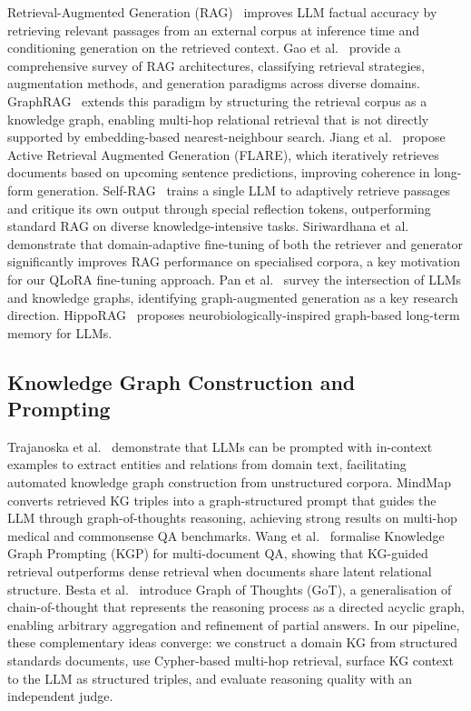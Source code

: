\documentclass[twocolumn]{article}
\begin{document}
Retrieval-Augmented Generation (RAG)~\cite{lewis2020rag} improves LLM factual accuracy by
retrieving relevant passages from an external corpus at inference time and conditioning
generation on the retrieved context.
Gao et al.~\cite{gao2024ragsurvey} provide a comprehensive survey of RAG architectures,
classifying retrieval strategies, augmentation methods, and generation paradigms across
diverse domains.
GraphRAG~\cite{edge2024graphrag} extends this paradigm by structuring the retrieval corpus
as a knowledge graph, enabling multi-hop relational retrieval that is not directly supported
by embedding-based nearest-neighbour search.
Jiang et al.~\cite{jiang2023active} propose Active Retrieval Augmented Generation (FLARE),
which iteratively retrieves documents based on upcoming sentence predictions, improving
coherence in long-form generation.
Self-RAG~\cite{asai2024selfrag} trains a single LLM to adaptively retrieve passages and
critique its own output through special reflection tokens, outperforming standard RAG on
diverse knowledge-intensive tasks.
Siriwardhana et al.~\cite{siriwardhana2023domainrag} demonstrate that domain-adaptive
fine-tuning of both the retriever and generator significantly improves RAG performance
on specialised corpora, a key motivation for our QLoRA fine-tuning approach.
Pan et al.~\cite{pan2024unifying} survey the intersection of LLMs and knowledge graphs,
identifying graph-augmented generation as a key research direction.
HippoRAG~\cite{guo2024hipporag} proposes neurobiologically-inspired graph-based long-term
memory for LLMs.

\subsection{Knowledge Graph Construction and Prompting}

Trajanoska et al.~\cite{trajanoska2023kg} demonstrate that LLMs can be prompted with
in-context examples to extract entities and relations from domain text, facilitating
automated knowledge graph construction from unstructured corpora.
MindMap~\cite{wen2024mindmap} converts retrieved KG triples into a graph-structured prompt
that guides the LLM through graph-of-thoughts reasoning, achieving strong results on
multi-hop medical and commonsense QA benchmarks.
Wang et al.~\cite{wang2024kgp} formalise Knowledge Graph Prompting (KGP) for
multi-document QA, showing that KG-guided retrieval outperforms dense retrieval when
documents share latent relational structure.
Besta et al.~\cite{besta2024got} introduce Graph of Thoughts (GoT), a generalisation of
chain-of-thought that represents the reasoning process as a directed acyclic graph,
enabling arbitrary aggregation and refinement of partial answers.
In our pipeline, these complementary ideas converge: we construct a domain KG from structured standards
documents, use Cypher-based multi-hop retrieval, surface KG context to the LLM as
structured triples, and evaluate reasoning quality with an independent judge.
\end{document}
